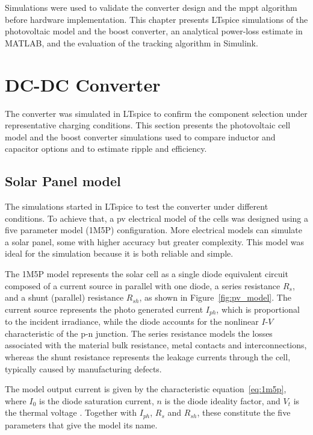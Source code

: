 \label{chap:sims}

    Simulations were used to validate the converter design and the \ac{mppt} algorithm before hardware implementation. This chapter presents LTspice simulations of the photovoltaic model and the boost converter, an analytical power-loss estimate in MATLAB, and the evaluation of the tracking algorithm in Simulink.

    \section{DC-DC Converter}

        The converter was simulated in LTspice to confirm the component selection under representative charging conditions. This section presents the photovoltaic cell model and the boost converter simulations used to compare inductor and capacitor options and to estimate ripple and efficiency.

    \subsection{Solar Panel model}

        The simulations started in LTspice to test the converter under different conditions. To achieve that, a \ac{pv} electrical model of the cells was designed using a five parameter model (1M5P) configuration. More electrical models can simulate a solar panel, some with higher accuracy but greater complexity. This model was ideal for the simulation because it is both reliable and simple.

        The 1M5P model represents the solar cell as a single diode equivalent circuit composed of a current source in parallel with one diode, a series resistance $R_s$, and a shunt (parallel) resistance $R_{sh}$, as shown in Figure~\ref{fig:pv_model}. The current source represents the photo generated current $I_{ph}$, which is proportional to the incident irradiance, while the diode accounts for the nonlinear $I$-$V$ characteristic of the p-n junction. The series resistance models the losses associated with the material bulk resistance, metal contacts and interconnections, whereas the shunt resistance represents the leakage currents through the cell, typically caused by manufacturing defects.

        The model output current is given by the characteristic equation~\ref{eq:1m5p}, where $I_0$ is the diode saturation current, $n$ is the diode ideality factor, and $V_t$ is the thermal voltage \cite{LOBRANO2013894}. Together with $I_{ph}$, $R_s$ and $R_{sh}$, these constitute the five parameters that give the model its name.

